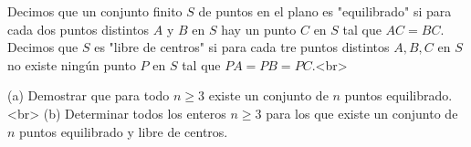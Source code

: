 Decimos que un conjunto finito $S$ de puntos en el plano es "equilibrado" si para cada dos puntos distintos $A$ y $B$ en $S$ hay un punto $C$ en $S$ tal que $AC=BC$. Decimos que $S$ es "libre de centros" si para cada tre puntos distintos $A,B,C$ en $S$ no existe ningún punto $P$ en $S$ tal que $PA=PB=PC$.<br>

(a) Demostrar que para todo $n\ge 3$ existe un conjunto de $n$ puntos equilibrado.<br>
(b) Determinar todos los enteros $n\ge 3$ para los que existe un conjunto de $n$ puntos equilibrado y libre de centros.